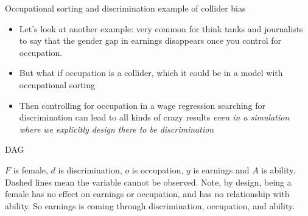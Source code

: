 \documentclass{beamer}
\begin{document}
\begin{frame}{Occupational sorting and discrimination example of collider bias}

  \begin{itemize}
    \item Let's look at another example: very common for think tanks and journalists to say that the gender gap in earnings disappears once you control for occupation.
    \item But what if occupation is a collider, which it could be in a model with occupational sorting
    \item Then controlling for occupation in a wage regression searching for discrimination can lead to all kinds of crazy results \emph{even in a simulation where we explicitly design there to be discrimination}
  \end{itemize}

\end{frame}

\begin{frame}{DAG}

  \begin{center}
  \end{center}

  $F$ is female, $d$ is discrimination, $o$ is occupation, $y$ is earnings and $A$ is ability. Dashed lines mean the variable cannot be observed. Note, by design, being a female has no effect on earnings or occupation, and has no relationship with ability. So earnings is coming through discrimination, occupation, and ability.

\end{frame}
\end{document}
